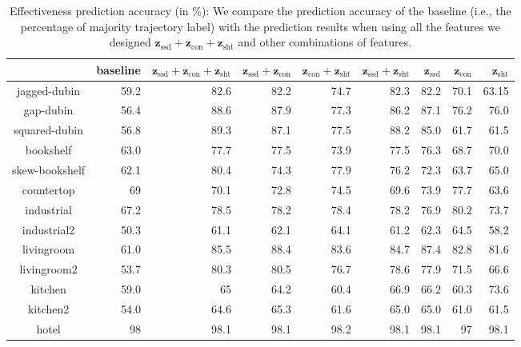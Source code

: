 \documentclass[letterpaper, 10 pt, conference]{ieeeconf}  %
\newcommand{\fssd}{\mbox{$\mathbf z_{\text{ssd}}$}}
\newcommand{\fcon}{\mbox{$\mathbf z_{\text{con}}$}}
\newcommand{\fsht}{\mbox{$\mathbf z_{\text{sht}}$}}
\begin{document}
\begin{table}[tbp]
\centering
\begin{tabular}{|c|r|r|r|r|r|r|r|r|}
\hline 
 & baseline & $\fssd+\fcon+\fsht$ & $\fssd+\fcon$ & $\fcon+\fsht$ & $\fssd+\fsht$ & $\fssd$ & $\fcon$ & $\fsht$ \\ \hline \hline
jagged-dubin & 59.2 & 82.6	& 82.2 & 74.7 & 82.3 & 82.2 & 70.1 & 63.15 \\ \hline
gap-dubin & 56.4 & 88.6 & 87.9 & 77.3 & 86.2 & 87.1 & 76.2 & 76.0 \\ \hline
squared-dubin & 56.8 & 89.3 & 	87.1 & 	77.5 &	88.2 &	85.0 &	 61.7	& 61.5 \\ \hline \hline

bookshelf & 63.0 & 77.7 & 	77.5 &	73.9 &	77.5 &	76.3 &	68.7 & 70.0 \\ \hline
skew-bookshelf & 62.1 & 80.4 &	74.3 & 	77.9 & 	76.2 &	72.3 &	63.7 &	65.0 \\ \hline
countertop & 69 & 70.1	& 72.8 & 	74.5	 & 69.6 & 	73.9 &	77.7 &	63.6 \\ \hline
industrial & 67.2 & 78.5 &	78.2 &	78.4 &	78.2 &	76.9 &	80.2 & 	73.7 \\ \hline
industrial2 & 50.3 & 61.1 & 	62.1	 & 64.1 &	61.2 & 	62.3 & 	64.5 &	58.2 \\ \hline \hline

livingroom & 61.0 & 85.5	& 88.4 &	 83.6 &	84.7 &	87.4 & 	82.8 &	81.6 \\ \hline
livingroom2 & 53.7 & 80.3 &	 80.5	& 76.7 &	 78.6 &	77.9 & 	71.5 & 	66.6 \\ \hline
kitchen & 59.0 & 65 & 	64.2 & 	60.4 &	66.9 & 	66.2 & 	60.3 & 	73.6 \\ \hline
kitchen2 & 54.0 & 64.6 &	65.3 & 	61.6 & 	65.0 & 	65.0 & 	61.0 &	61.5 \\ \hline
hotel & 98 & 98.1 &	98.1 & 	98.2 &	98.1 &	98.1 &	97	& 98.1 \\ \hline
\end{tabular}
\caption{Effectiveness prediction accuracy (in \%): We compare the prediction accuracy of the baseline (i.e., the percentage of majority trajectory label) with the prediction results when using all the features we designed $\fssd+\fcon+\fsht$ and other combinations of features.}
\label{tab:result}
\end{table}
\end{document}

